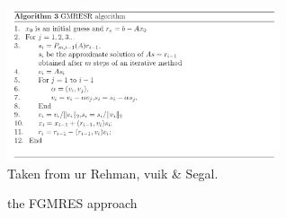 




 









\begin{center}
\includegraphics[width=8cm]{images/solvers/GMRESR}\\
{\captionfont Taken from ur Rehman, vuik \& Segal.}
\end{center}

the FGMRES approach \cite{deit13}

\Literature \cite{pasa75,mamo08,fumt11,knke04,kool00,kopo93} 

